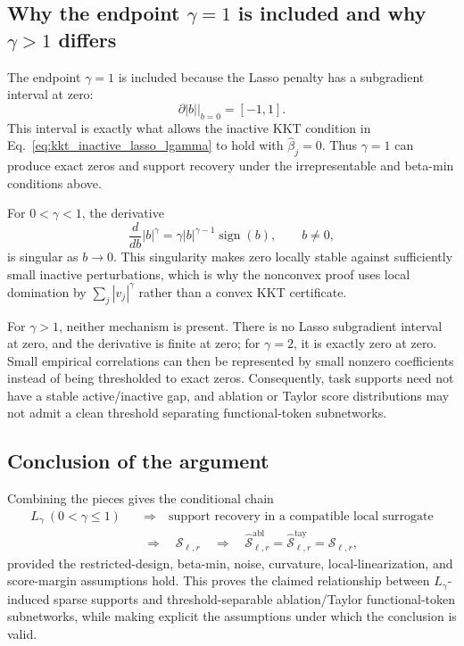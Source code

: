 \documentclass{article}
\begin{document}
\subsection{Why the endpoint \(\gamma=1\) is included and why \(\gamma>1\) differs}

The endpoint \(\gamma=1\) is included because the Lasso penalty has a subgradient interval at zero:
\begin{equation}
\partial |b|\big|_{b=0}=[-1,1].
\end{equation}
This interval is exactly what allows the inactive KKT condition in Eq.~\eqref{eq:kkt_inactive_lasso_lgamma} to hold with \(\widehat\beta_j=0\). Thus \(\gamma=1\) can produce exact zeros and support recovery under the irrepresentable and beta-min conditions above.

For \(0<\gamma<1\), the derivative
\begin{equation}
\frac{d}{db}|b|^\gamma=\gamma |b|^{\gamma-1}\operatorname{sign}(b),
\qquad b\ne0,
\end{equation}
is singular as \(b\to0\). This singularity makes zero locally stable against sufficiently small inactive perturbations, which is why the nonconvex proof uses local domination by \(\sum_j|v_j|^\gamma\) rather than a convex KKT certificate.

For \(\gamma>1\), neither mechanism is present. There is no Lasso subgradient interval at zero, and the derivative is finite at zero; for \(\gamma=2\), it is exactly zero at zero. Small empirical correlations can then be represented by small nonzero coefficients instead of being thresholded to exact zeros. Consequently, task supports need not have a stable active/inactive gap, and ablation or Taylor score distributions may not admit a clean threshold separating functional-token subnetworks.

\subsection{Conclusion of the argument}

Combining the pieces gives the conditional chain
\begin{equation}
\begin{aligned}
L_\gamma\ (0<\gamma\le1)
&\quad\Longrightarrow\quad
\text{support recovery in a compatible local surrogate}
\\[-1pt]
&\quad\Longrightarrow\quad
\mathcal S_{\ell,r}
\quad\Longrightarrow\quad
\widehat{\mathcal S}^{\mathrm{abl}}_{\ell,r}
=
\widehat{\mathcal S}^{\mathrm{tay}}_{\ell,r}
=
\mathcal S_{\ell,r},
\end{aligned}
\end{equation}
provided the restricted-design, beta-min, noise, curvature, local-linearization, and score-margin assumptions hold. This proves the claimed relationship between \(L_\gamma\)-induced sparse supports and threshold-separable ablation/Taylor functional-token subnetworks, while making explicit the assumptions under which the conclusion is valid.
\end{document}

